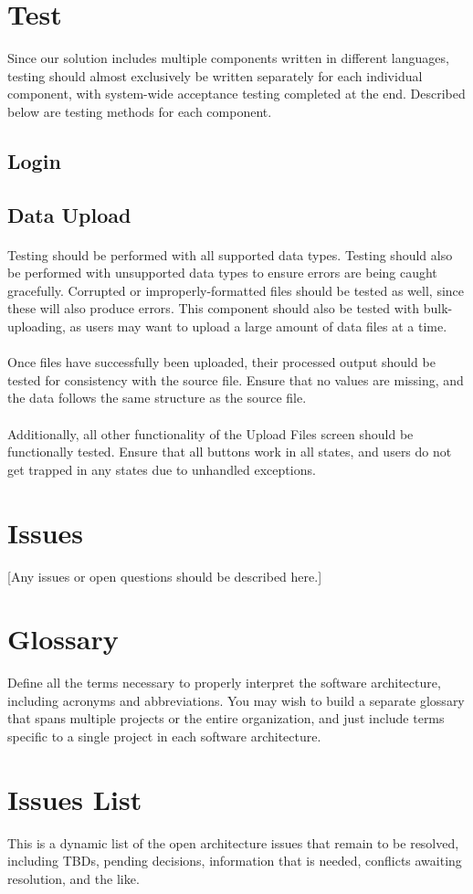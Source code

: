 \documentclass[12pt,oneside,letterpaper]{article}
\begin{document}
\section{Test}
Since our solution includes multiple components written in different languages, testing should almost exclusively be written separately for each individual component, with system-wide acceptance testing completed at the end. Described below are testing methods for each component.

\subsection{Login}

\subsection{Data Upload}
\paragraph{} Testing should be performed with all supported data types. Testing should also be performed with unsupported data types to ensure errors are being caught gracefully. Corrupted or improperly-formatted files should be tested as well, since these will also produce errors. This component should also be tested with bulk-uploading, as users may want to upload a large amount of data files at a time.
\paragraph{} Once files have successfully been uploaded, their processed output should be tested for consistency with the source file. Ensure that no values are missing, and the data follows the same structure as the source file.
\paragraph{} Additionally, all other functionality of the Upload Files screen should be functionally tested. Ensure that all buttons work in all states, and users do not get trapped in any states due to unhandled exceptions.

\section{Issues}
[Any issues or open questions should be described here.]

\appendix
\section{Glossary}
Define all the terms necessary to properly interpret the software architecture, including acronyms and abbreviations. You may wish to build a separate glossary that spans multiple projects or the entire organization, and just include terms specific to a single project in each software architecture.

\section{Issues List}
This is a dynamic list of the open architecture issues that remain to be resolved, including TBDs, pending decisions, information that is needed, conflicts awaiting resolution, and the like.
\end{document}
